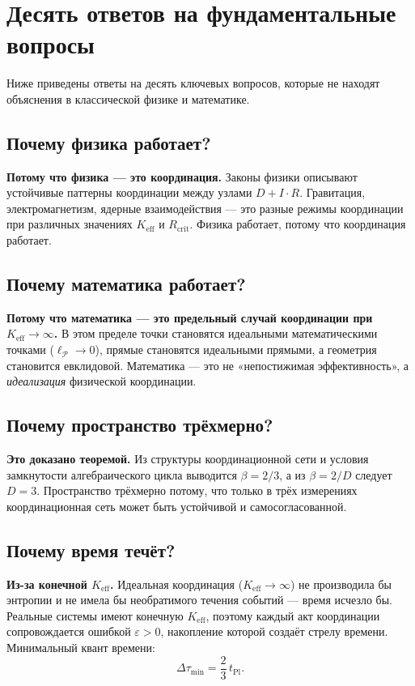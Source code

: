 \documentclass[12pt,a4paper]{article}
\newcommand{\Keff}{K_{\mathrm{eff}}}
\newcommand{\eps}{\varepsilon}
\newcommand{\betaf}{\beta}
\newcommand{\tPl}{t_{\mathrm{Pl}}}
\newcommand{\Rcrit}{R_{\mathrm{crit}}}
\newcommand{\calP}{\mathcal{P}}
\begin{document}
	\section{Десять ответов на фундаментальные вопросы}
	
	Ниже приведены ответы на десять ключевых вопросов, которые не находят объяснения в классической физике и математике.
	
	\subsection{Почему физика работает?}
	
	\textbf{Потому что физика — это координация.} Законы физики описывают устойчивые паттерны координации между узлами \(D+I\cdot R\). Гравитация, электромагнетизм, ядерные взаимодействия — это разные режимы координации при различных значениях \(\Keff\) и \(\Rcrit\). Физика работает, потому что координация работает.
	
	\subsection{Почему математика работает?}
	
	\textbf{Потому что математика — это предельный случай координации при \(\Keff \to \infty\).} В этом пределе точки становятся идеальными математическими точками (\(\ell_{\calP} \to 0\)), прямые становятся идеальными прямыми, а геометрия становится евклидовой. Математика — это не «непостижимая эффективность», а \emph{идеализация} физической координации.
	
	\subsection{Почему пространство трёхмерно?}
	
	\textbf{Это доказано теоремой.} Из структуры координационной сети и условия замкнутости алгебраического цикла выводится \(\betaf = 2/3\), а из \(\betaf = 2/D\) следует \(D=3\). Пространство трёхмерно потому, что только в трёх измерениях координационная сеть может быть устойчивой и самосогласованной.
	
	\subsection{Почему время течёт?}
	
	\textbf{Из-за конечной \(\Keff\).} Идеальная координация (\(\Keff \to \infty\)) не производила бы энтропии и не имела бы необратимого течения событий — время исчезло бы. Реальные системы имеют конечную \(\Keff\), поэтому каждый акт координации сопровождается ошибкой \(\eps > 0\), накопление которой создаёт стрелу времени. Минимальный квант времени:
	\[
	\Delta \tau_{\min} = \frac{2}{3}\,\tPl.
	\]
	
\end{document}
